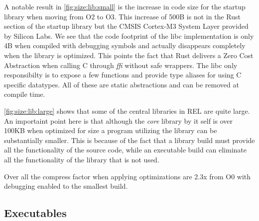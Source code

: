 A notable result in \autoref{fig:size:lib:small} is the increase in code size for the startup library when moving from O2 to O3.
This increase of 500B is not in the Rust section of the startup library but the CMSIS Cortex-M3 System Layer provided by Silicon Labs.
We see that the code footprint of the libc implementation is only 4B when compiled with debugging symbols and actually disappears completely when the library is optimized.
This points the fact that Rust delivers a Zero Cost Abstraction when calling C through \emph{ffi} without safe wrappers.
The libc only responsibilty is to expose a few functions and provide type aliases for using C specific datatypes.
All of these are static abstractions and can be removed at compile time.

\autoref{fig:size:lib:large} shows that some of the central libraries in REL are quite large.
An importaint point here is that although the \emph{core} library by it self is over 100KB when optimized for size a program utilizing the library can be substantially smaller.
This is because of the fact that a library build must provide all the functionality of the source code, while an executable build can eliminate all the functionality of the library that is not used.

Over all the compress factor when applying optimizations are 2.3x from O0 with debugging enabled to the smallest build.

\subsection{Executables}

